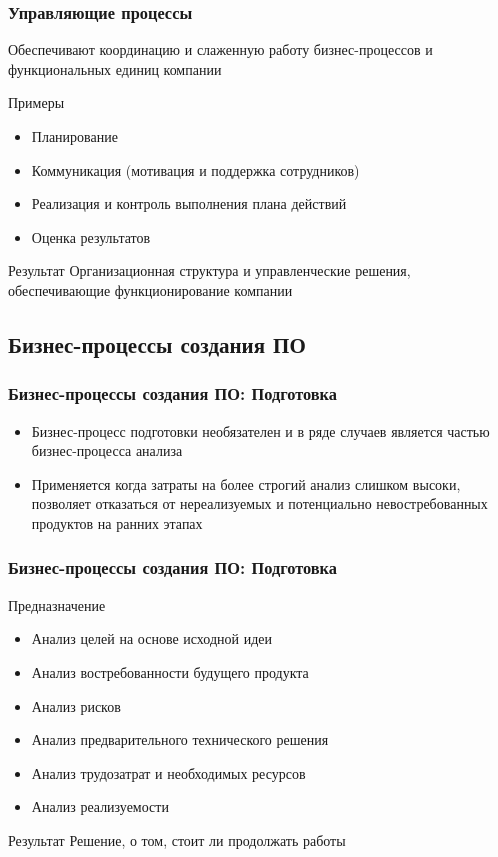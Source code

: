 \documentclass{../industrial-development}
\begin{document}
\begin{frame} \frametitle{Управляющие процессы}
	\begin{block}{}
		Обеспечивают координацию и слаженную работу бизнес-процессов и функциональных единиц компании
	\end{block}
	\begin{block}{Примеры}
		\begin{itemize}
		\item Планирование
		\item Коммуникация (мотивация и поддержка сотрудников)
		\item Реализация и контроль выполнения плана действий
		\item Оценка результатов
		\end{itemize}
	\end{block}
	\begin{block}{Результат}
		Организационная структура и управленческие решения, обеспечивающие функционирование компании
	\end{block}
\end{frame}
\lecturenotes


\subsection{Бизнес-процессы создания ПО}


\begin{frame} \frametitle{Бизнес-процессы создания ПО: Подготовка}
	\begin{itemize}
		\item Бизнес-процесс подготовки необязателен и в ряде случаев является частью бизнес-процесса анализа
		\item Применяется когда затраты на более строгий анализ слишком высоки, позволяет отказаться от нереализуемых и потенциально невостребованных продуктов на ранних этапах
	\end{itemize}
\end{frame}
\lecturenotes


\begin{frame} \frametitle{Бизнес-процессы создания ПО: Подготовка}
	\begin{block}{Предназначение}
		\begin{itemize}
			\item Анализ целей на основе исходной идеи
			\item Анализ востребованности будущего продукта
			\item Анализ рисков
			\item Анализ предварительного технического решения
			\item Анализ трудозатрат и необходимых ресурсов
			\item Анализ реализуемости
		\end{itemize}
	\end{block}
	\begin{block}{Результат}
		Решение, о том, стоит ли продолжать работы
	\end{block}
\end{frame}
\lecturenotes
\end{document}

